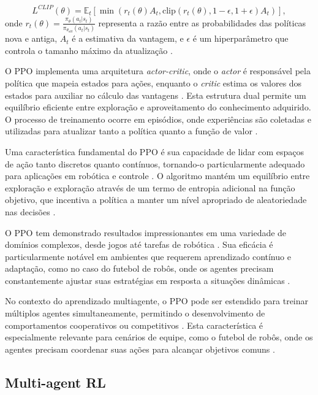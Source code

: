 \begin{equation}
L^{CLIP}(\theta) = \mathbb{E}_t \left[ \min\left( r_t(\theta) A_t, \text{clip}(r_t(\theta), 1-\epsilon, 1+\epsilon) A_t \right) \right],
\end{equation}
onde $r_t(\theta) = \frac{\pi_\theta(a_t|s_t)}{\pi_{\theta_{old}}(a_t|s_t)}$ representa a razão entre as probabilidades das políticas nova e antiga, $A_t$ é a estimativa da vantagem, e $\epsilon$ é um hiperparâmetro que controla o tamanho máximo da atualização \cite{stable_baselines3, PPO}.

O PPO implementa uma arquitetura \textit{actor-critic}, onde o \textit{actor} é responsável pela política que mapeia estados para ações, enquanto o \textit{critic} estima os valores dos estados para auxiliar no cálculo das vantagens \cite{PPO, pytorch_ppo}. Esta estrutura dual permite um equilíbrio eficiente entre exploração e aproveitamento do conhecimento adquirido. O processo de treinamento ocorre em episódios, onde experiências são coletadas e utilizadas para atualizar tanto a política quanto a função de valor \cite{PPO}.

Uma característica fundamental do PPO é sua capacidade de lidar com espaços de ação tanto discretos quanto contínuos, tornando-o particularmente adequado para aplicações em robótica e controle \cite{sutton, PPO}. O algoritmo mantém um equilíbrio entre exploração e exploração através de um termo de entropia adicional na função objetivo, que incentiva a política a manter um nível apropriado de aleatoriedade nas decisões \cite{PPO}.

O PPO tem demonstrado resultados impressionantes em uma variedade de domínios complexos, desde jogos até tarefas de robótica \cite{ppo_env_gym}. Sua eficácia é particularmente notável em ambientes que requerem aprendizado contínuo e adaptação, como no caso do futebol de robôs, onde os agentes precisam constantemente ajustar suas estratégias em resposta a situações dinâmicas \cite{bruno_brandao}.

No contexto do aprendizado multiagente, o PPO pode ser estendido para treinar múltiplos agentes simultaneamente, permitindo o desenvolvimento de comportamentos cooperativos ou competitivos \cite{pytorch_ppo}. Esta característica é especialmente relevante para cenários de equipe, como o futebol de robôs, onde os agentes precisam coordenar suas ações para alcançar objetivos comuns \cite{ppo_env_gym, bruno_brandao}.

\subsection{Multi-agent RL}
\label{subsec:marl}

